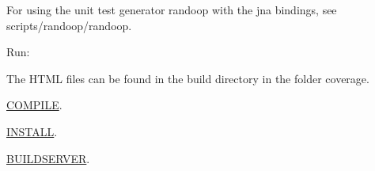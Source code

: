 For using the unit test generator randoop with the jna bindings, see {\ttfamily scripts/randoop/randoop}.

Run\+:


\begin{DoxyCode}{0}
\end{DoxyCode}


The H\+T\+ML files can be found in the build directory in the folder {\ttfamily coverage}.


\begin{DoxyItemize}
\item \mbox{\hyperlink{doc_COMPILE_md}{C\+O\+M\+P\+I\+LE}}.
\item \mbox{\hyperlink{doc_INSTALL_md}{I\+N\+S\+T\+A\+LL}}.
\item \mbox{\hyperlink{doc_BUILDSERVER_md}{B\+U\+I\+L\+D\+S\+E\+R\+V\+ER}}. 
\end{DoxyItemize}